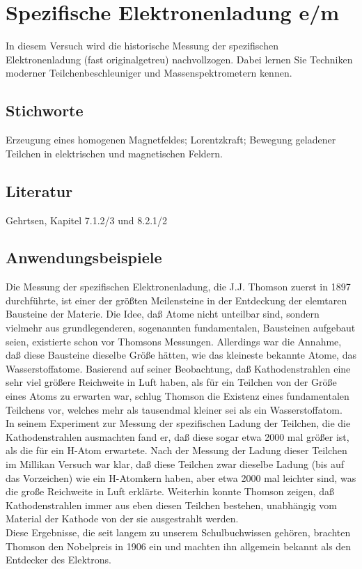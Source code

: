 \chapter{Spezifische Elektronenladung e/m}
\label{v:20}

In diesem Versuch wird die historische Messung der spezifischen Elektronenladung (fast originalgetreu) nachvollzogen. Dabei lernen Sie Techniken moderner Teilchenbeschleuniger und Massenspektrometern kennen.

\section{Stichworte}

Erzeugung eines homogenen Magnetfeldes; Lorentzkraft; Bewegung geladener Teilchen in elektrischen und magnetischen Feldern.
%
\section{Literatur}

Gehrtsen, Kapitel 7.1.2/3 und 8.2.1/2
%
\section{Anwendungsbeispiele}

Die Messung der spezifischen Elektronenladung, die J.J. Thomson zuerst in 1897 durchführte, ist einer der größten Meilensteine in der Entdeckung der elemtaren Bausteine der Materie. Die Idee, daß Atome nicht unteilbar sind, sondern vielmehr aus grundlegenderen, sogenannten fundamentalen, Bausteinen aufgebaut seien, existierte schon vor Thomsons Messungen. Allerdings war die Annahme, daß diese Bausteine dieselbe Größe hätten, wie das kleineste bekannte Atome, das Wasserstoffatome. Basierend auf seiner Beobachtung, daß Kathodenstrahlen eine sehr viel größere Reichweite in Luft haben, als für ein Teilchen von der Größe eines Atoms zu erwarten war, schlug Thomson die Existenz eines fundamentalen Teilchens vor, welches mehr als tausendmal kleiner sei als ein Wasserstoffatom.\\
In seinem Experiment zur Messung der spezifischen Ladung der Teilchen, die die Kathodenstrahlen ausmachten fand er, daß diese sogar etwa 2000 mal größer ist, als die für ein H-Atom erwartete. Nach der Messung der Ladung dieser Teilchen im Millikan Versuch war klar, daß diese Teilchen zwar dieselbe Ladung (bis auf das Vorzeichen) wie ein H-Atomkern haben, aber etwa 2000 mal leichter sind, was die große Reichweite in Luft erklärte. Weiterhin konnte Thomson zeigen, daß Kathodenstrahlen immer aus eben diesen Teilchen bestehen, unabhängig vom Material der Kathode von der sie ausgestrahlt werden.\\
Diese Ergebnisse, die seit langem zu unserem Schulbuchwissen gehören, brachten Thomson den Nobelpreis in 1906 ein und machten ihn allgemein bekannt als den Entdecker des Elektrons.\\

